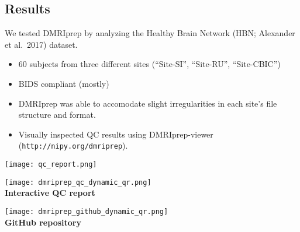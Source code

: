 \documentclass[a0, landscape]{a0poster}
\newenvironment{Figure}
  {\par\medskip\noindent\minipage{\linewidth}}
  {\endminipage\par\medskip}
\begin{document}
\begin{multicols}{3}
\color{Navy}


\section*{Results}

\noindent We tested DMRIprep by analyzing the Healthy Brain Network (HBN; Alexander et al.~2017) dataset.
\begin{itemize}
    \item 60 subjects from three different sites (``Site-SI'', ``Site-RU'', ``Site-CBIC'')
    \item BIDS compliant (mostly)
    \item DMRIprep was able to accomodate slight irregularities in each site's file structure and format.
    \item Visually inspected QC results using DMRIprep-viewer (\texttt{http://nipy.org/dmriprep}).
\end{itemize}

\begin{Figure}
    \centering
    \texttt{[image: qc\_report.png]}
\end{Figure}

\vfill
\columnbreak

\begin{minipage}[b]{0.45\linewidth}
\begin{Figure}
    \centering
    \texttt{[image: dmriprep\_qc\_dynamic\_qr.png]}\\
    \color{Navy} \textbf{Interactive QC report}
\end{Figure}
\end{minipage}
\begin{minipage}[b]{0.45\linewidth}
\begin{Figure}
    \centering
    \texttt{[image: dmriprep\_github\_dynamic\_qr.png]}\\
    \color{Navy} \textbf{GitHub repository}
\end{Figure}
\end{minipage}


\end{multicols}
\end{document}
